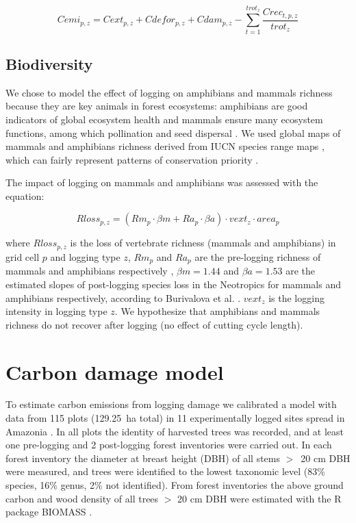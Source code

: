 \documentclass{article}
\begin{document}
\begin{equation}
\label{eq:cemi}
    Cemi_{p,z} = Cext_{p,z} + Cdefor_{p,z} + Cdam_{p,z} -  \sum_{t=1}^{trot_z} \frac{Crec_{t,p,z}}{trot_z} 
\end{equation}

\subsection{Biodiversity}

We chose to model the effect of logging on amphibians and mammals richness because they are key animals in forest ecosystems: amphibians are good indicators of global ecosystem health \cite{Welsh1998,Collins2003} and mammals ensure many ecosystem functions, among which pollination \cite{Fleming2009} and seed dispersal \cite{Wright2000,Muscarella2007}. We used global maps of mammals and amphibians richness derived from IUCN species range maps \cite{Jenkins2013,MapBiodiv}, which can fairly represent patterns of conservation priority \cite{Marechaux2017}.

The impact of logging on mammals and amphibians was assessed with the equation: 

\begin{equation}
\label{eq:rloss}
Rloss_{p,z} = \left(Rm_{p} \cdot \beta m + Ra_{p} \cdot \beta a  \right)  \cdot vext_z \cdot area_p 
\end{equation}

where $Rloss_{p,z}$ is the loss of vertebrate richness (mammals and amphibians) in grid cell $p$ and logging type $z$, $Rm_{p}$ and $Ra_p$ are the pre-logging richness of mammals and amphibians respectively \cite{Jenkins2013}, $\beta m = 1.44$ and $\beta a = 1.53$  are the estimated slopes of post-logging species loss in the Neotropics for mammals and amphibians respectively, according to Burivalova et al.  \cite{Burivalova2014}. $vext_z$ is the logging intensity in logging type $z$.
We hypothesize that amphibians and mammals richness do not recover after logging (no effect of cutting cycle length). 

\section{Carbon damage model}
\label{supmat:cdam}

To estimate carbon emissions from logging damage we calibrated a model with data from 115 plots (129.25~ha total) in 11 experimentally logged sites spread in Amazonia \cite{Sist2015}. In all plots the identity of harvested trees was recorded, and at least one pre-logging and 2 post-logging forest inventories were carried out. In each forest inventory the diameter at breast height (DBH) of all stems $>$~20 cm DBH were measured, and trees were identified to the lowest taxonomic level (83\% species, 16\% genus, 2\% not identified). 
From forest inventories the above ground carbon and wood density of all trees $>$ 20 cm DBH  were estimated with the R package BIOMASS \cite{Rejou-Mechain2017}. 
\end{document}
